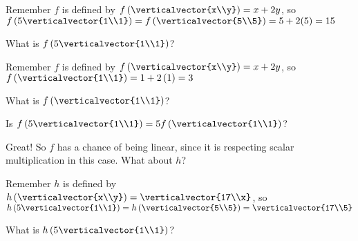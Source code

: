 \documentclass{ximera}
\begin{document}
\begin{question}
\begin{solution}
\begin{hint}
        \begin{question}
        	\begin{solution}
		\begin{hint}
			Remember $f$ is defined by $f\left( \verticalvector{x\\y}\right) =x+2y$, so
			$f\left(5 \verticalvector{1\\1}\right) = f\left(\verticalvector{5\\5}\right) = 5+2(5) = 15$
		\end{hint}
        	 What is $f\left(5 \verticalvector{1\\1}\right)$?
        	\end{solution}
        	\begin{solution}
		\begin{hint}
			Remember $f$ is defined by $f\left( \verticalvector{x\\y}\right) =x+2y$, so
			$f\left(\verticalvector{1\\1}\right) = 1+2\left(1\right) = 3$
		\end{hint}
        	 What is $f\left(\verticalvector{1\\1}\right)$?
        	 \answer{3}
        	\end{solution}
        	\begin{solution}
        		Is $f\left(5 \verticalvector{1\\1}\right) = 5 f\left(\verticalvector{1\\1}\right)$?
        		\begin{multiple-choice}
        		\choice[correct]{Yes}
        		\choice{No}
        		\end{multiple-choice}
        	\end{solution}
        	Great!  So $f$ has a chance of being linear, since it is respecting scalar multiplication in this case.
        	What about $h$?
        	\begin{solution}
		\begin{hint}
			Remember $h$ is defined by $h\left( \verticalvector{x\\y}\right) =\verticalvector{17\\x}$, so
			$h\left(5 \verticalvector{1\\1}\right) = h\left(\verticalvector{5\\5}\right) = \verticalvector{17\\5}$
		\end{hint}
        	 What is $h\left(5 \verticalvector{1\\1}\right)$?

\end{solution}
\end{question}
\end{hint}
\end{solution}
\end{question}
\end{document}
